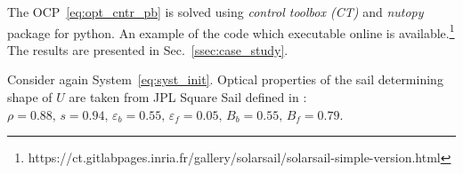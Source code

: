 \documentclass[AMA,STIX1COL]{WileyNJD-v2}
\renewcommand{\epsilon}{\varepsilon}
\begin{document}
The \ac{OCP}~\eqref{eq:opt_cntr_pb} is solved using \textit{control toolbox (CT)} and \textit{nutopy} package for python. An example of the code which executable online is available.\footnote{https://ct.gitlabpages.inria.fr/gallery/solarsail/solarsail-simple-version.html} The results are presented in Sec.~\ref{ssec:case_study}.


Consider again System~\eqref{eq:syst_init}. Optical properties of the sail determining shape of $U$ are taken from JPL Square Sail defined in \cite[Table 2.1]{McInnes_1999}: $\rho = 0.88, \, s = 0.94, \, \epsilon_b = 0.55, \, \epsilon_f = 0.05,  \, B_b = 0.55, \,  B_f = 0.79$. 
\end{document}

